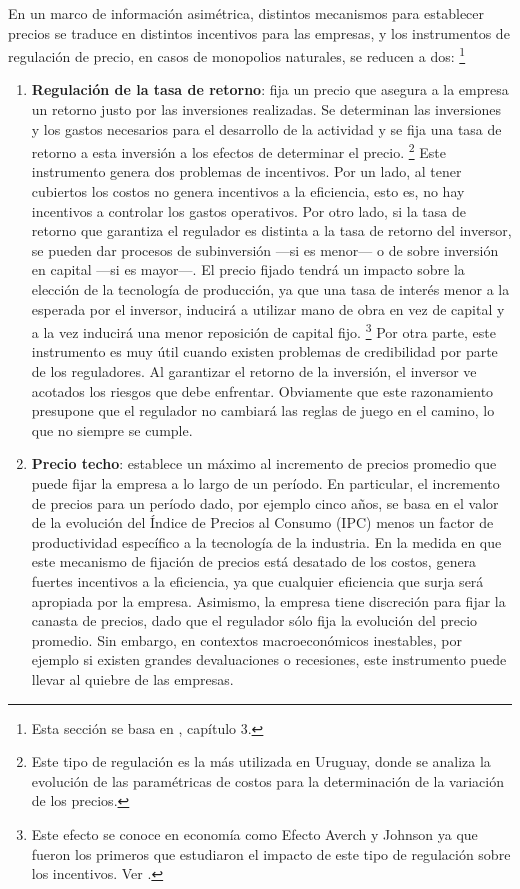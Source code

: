 \documentclass[
  12pt,
  spanish,
]{book}
\begin{document}
En un marco de información asimétrica, distintos mecanismos para establecer precios se traduce en distintos incentivos para las empresas, y los instrumentos de regulación de precio, en casos de monopolios naturales, se reducen a dos:
\footnote{Esta sección se basa en \citet{Armstrong2007}, capítulo 3.}

\begin{enumerate}
\def\labelenumi{\arabic{enumi}.}
\item
  \textbf{Regulación de la tasa de retorno}: fija un precio que asegura a la empresa un retorno justo por las inversiones realizadas. Se determinan las inversiones y los gastos necesarios para el desarrollo de la actividad y se fija una tasa de retorno a esta inversión a los efectos de determinar el precio.
  \footnote{Este tipo de regulación es la más utilizada en Uruguay, donde se analiza la evolución de las paramétricas de costos para la determinación de la variación de los precios.}
  Este instrumento genera dos problemas de incentivos. Por un lado, al tener cubiertos los costos no genera incentivos a la eficiencia, esto es, no hay incentivos a controlar los gastos operativos. Por otro lado, si la tasa de retorno que garantiza el regulador es distinta a la tasa de retorno del inversor, se pueden dar procesos de subinversión ---si es menor--- o de sobre inversión en capital ---si es mayor---. El precio fijado tendrá un impacto sobre la elección de la tecnología de producción, ya que una tasa de interés menor a la esperada por el inversor, inducirá a utilizar mano de obra en vez de capital y a la vez inducirá una menor reposición de capital fijo.
  \footnote{Este efecto se conoce en economía como Efecto Averch y Johnson ya que fueron los primeros que estudiaron el impacto de este tipo de regulación sobre los incentivos. Ver \citet{Averch1962}.}
  Por otra parte, este instrumento es muy útil cuando existen problemas de credibilidad por parte de los reguladores. Al garantizar el retorno de la inversión, el inversor ve acotados los riesgos que debe enfrentar. Obviamente que este razonamiento presupone que el regulador no cambiará las reglas de juego en el camino, lo que no siempre se cumple.
\item
  \textbf{Precio techo}: establece un máximo al incremento de precios promedio que puede fijar la empresa a lo largo de un período. En particular, el incremento de precios para un período dado, por ejemplo cinco años, se basa en el valor de la evolución del Índice de Precios al Consumo (IPC) menos un factor de productividad específico a la tecnología de la industria. En la medida en que este mecanismo de fijación de precios está desatado de los costos, genera fuertes incentivos a la eficiencia, ya que cualquier eficiencia que surja será apropiada por la empresa. Asimismo, la empresa tiene discreción para fijar la canasta de precios, dado que el regulador sólo fija la evolución del precio promedio. Sin embargo, en contextos macroeconómicos inestables, por ejemplo si existen grandes
  devaluaciones o recesiones, este instrumento puede llevar al quiebre de las empresas.
\end{enumerate}
\end{document}
